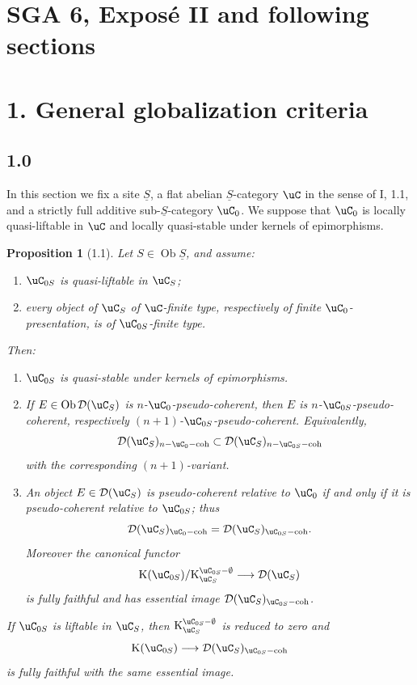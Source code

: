 \documentclass[11pt]{article}
\theoremstyle{plain}
\newtheorem*{proposition*}{Proposition}
\theoremstyle{definition}
\theoremstyle{remark}
\newcommand{\D}{\mathcal D}\newcommand{\E}{\mathcal E}\newcommand{\F}{\mathcal F}
\DeclareMathOperator{\ob}{Ob}
\providecommand{\K}{\mathrm K}
\providecommand{\uS}{\underline{S}}
\begin{document}
\clearpage
\section*{SGA 6, Exposé II and following sections}

\section*{1. General globalization criteria}

\subsection*{1.0}
In this section we fix a site $\uS$, a flat abelian $\uS$-category $\uC$ in the sense of I, 1.1, and a strictly full additive sub-$\uS$-category $\uC_0$. We suppose that $\uC_0$ is locally quasi-liftable in $\uC$ and locally quasi-stable under kernels of epimorphisms.

\begin{proposition*}[1.1]
Let $S\in\ob\uS$, and assume:
\begin{enumerate}[label=(\roman*)]
\item $\uC_{0S}$ is quasi-liftable in $\uC_S$;
\item every object of $\uC_S$ of $\uC$-finite type, respectively of finite $\uC_0$-presentation, is of $\uC_{0S}$-finite type.
\end{enumerate}
Then:
\begin{enumerate}[label=\alph*)]
\item $\uC_{0S}$ is quasi-stable under kernels of epimorphisms.
\item If $E\in\ob\D(\uC_S)$ is $n$-$\uC_0$-pseudo-coherent, then $E$ is $n$-$\uC_{0S}$-pseudo-coherent, respectively $(n+1)$-$\uC_{0S}$-pseudo-coherent. Equivalently,
\[
\D(\uC_S)_{n-\uC_0\mathrm{-coh}}
\subset
\D(\uC_S)_{n-\uC_{0S}\mathrm{-coh}}
\]
with the corresponding $(n+1)$-variant.
\item An object $E\in\D(\uC_S)$ is pseudo-coherent relative to $\uC_0$ if and only if it is pseudo-coherent relative to $\uC_{0S}$; thus
\[
\D(\uC_S)_{\uC_0\mathrm{-coh}}=
\D(\uC_S)_{\uC_{0S}\mathrm{-coh}}.
\]
Moreover the canonical functor
\[
\K(\uC_{0S})/\K^{\uC_{0S}-\emptyset}_{\uC_S}
\longrightarrow \D(\uC_S)
\]
is fully faithful and has essential image $\D(\uC_S)_{\uC_{0S}\mathrm{-coh}}$.
\end{enumerate}
If $\uC_{0S}$ is liftable in $\uC_S$, then $\K^{\uC_{0S}-\emptyset}_{\uC_S}$ is reduced to zero and
\[
\K(\uC_{0S})\longrightarrow \D(\uC_S)_{\uC_{0S}\mathrm{-coh}}
\]
is fully faithful with the same essential image.
\end{proposition*}
\end{document}
